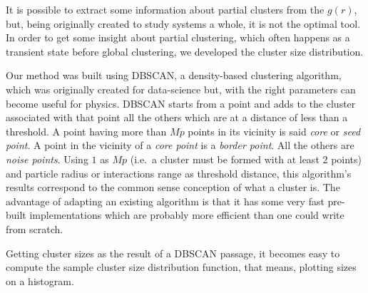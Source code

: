 \documentclass[../../master_thesis_np.tex]{subfiles}
\begin{document}
		It is possible to extract some information about partial clusters from the $g(r)$, but, being originally created to study systems a whole, it is not the optimal tool. In order to get some insight about partial clustering, which often happens as a transient state before global clustering, we developed the cluster size distribution. 
		
		Our method was built using DBSCAN, a density-based clustering algorithm, which was originally created for data-science but, with the right parameters can become useful for physics. DBSCAN starts from a point and adds to the cluster associated with that point all the others which are at a distance of less than a threshold. A point having more than $Mp$ points in its vicinity is said \emph{core} or \emph{seed point}. A point in the vicinity of a \emph{core point} is a \emph{border point}. All the others are \emph{noise points}. Using $1$ as $Mp$ (i.e.\ a cluster must be formed with at least 2 points) and particle radius or interactions range as threshold distance, this algorithm's results correspond to the common sense conception of what a cluster is. The advantage of adapting an existing algorithm is that it has some very fast pre-built implementations which are probably more efficient than one could write from scratch.
		
		Getting cluster sizes as the result of a DBSCAN passage, it becomes easy to compute the sample cluster size distribution function, that means, plotting sizes on a histogram.
\end{document}
